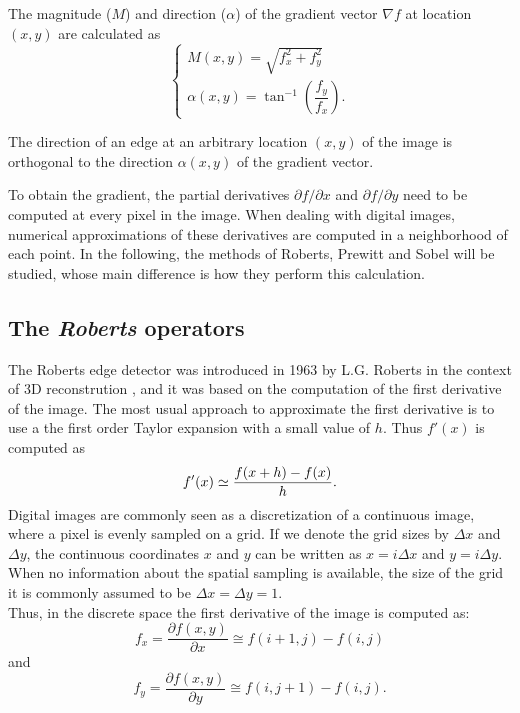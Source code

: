 \documentclass{ipol}
\numberwithin{equation}{section}
\numberwithin{table}{section}
\begin{document}
The magnitude ($M$) and direction ($\alpha$) of the gradient vector $\nabla f$ at location $(x,y)$
are calculated as
\begin{equation}
\label{eq:mag_alpha}
	\begin{cases}
		M(x,y) = \sqrt{f_x^2 + f_y^2} \\
		\alpha(x,y) = \tan^{-1} \left( \dfrac{f_y}{f_x} \right) .
	\end{cases}
\end{equation}

The direction of an edge at an arbitrary location $(x,y)$ of the image is 
orthogonal to the direction $\alpha(x,y)$ of the gradient vector.

To obtain the gradient, the partial derivatives $\partial f/\partial x$ and $\partial f/\partial y$ 
need to be computed at every pixel in the image. When dealing with digital images, numerical approximations 
of these derivatives are computed in a neighborhood of each point. In the following,
the methods of Roberts, Prewitt and Sobel will be studied, whose main difference is how they perform this calculation. 


\subsection{The \textit{Roberts} operators}

The Roberts edge detector was introduced in 1963 by L.G. Roberts in the context of 3D reconstrution \cite{im_proc:segmentation:roberts:1963:boundary_extraction}, and it was based on the computation of the first derivative of the image. The most usual approach to approximate the first derivative is to use a the first order Taylor expansion with a small value of $h$. Thus $f'(x)$ is computed as
\begin{equation}
	f'(x) \simeq \frac{f(x+h) - f(x)}{h}.\\
\end{equation}
Digital images are commonly seen as a discretization of a continuous image, where a pixel is evenly sampled on a grid. If we denote the grid sizes by $\Delta x$ and $\Delta y$, the continuous coordinates $x$  and $y$ can be written as $x=i\Delta x$ and $y=i\Delta y$. When no information about the spatial sampling is available, the size of the grid it is commonly assumed to be $\Delta x=\Delta y=1$.\\
Thus, in the discrete space the first derivative of the image is computed as:
\begin{equation}
\label{eq:roberts1}
	f_x = \frac{\partial f(x,y)}{\partial x} \cong f(i+1,j) - f(i,j)
\end{equation}
and
\begin{equation}
\label{eq:roberts2}
	f_y = \frac{\partial f(x,y)}{\partial y} \cong f(i,j+1) - f(i,j).
\end{equation}
\end{document}

